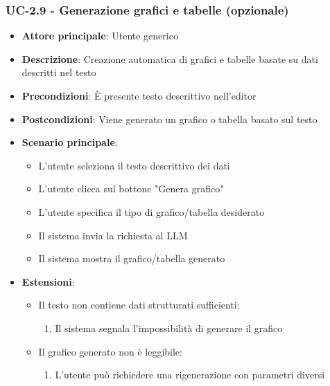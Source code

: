 \documentclass[11pt,a4paper]{article}
\begin{document}
\subsubsection{UC-2.9 - Generazione grafici e tabelle (opzionale)}
\begin{itemize}
    \item \textbf{Attore principale}: Utente generico
    \item \textbf{Descrizione}: Creazione automatica di grafici e tabelle basate su dati descritti nel testo
    \item \textbf{Precondizioni}: È presente testo descrittivo nell'editor
    \item \textbf{Postcondizioni}: Viene generato un grafico o tabella basato sul testo
    \item \textbf{Scenario principale}:
        \begin{itemize}
            \item L'utente seleziona il testo descrittivo dei dati
            \item L'utente clicca sul bottone "Genera grafico"
            \item L'utente specifica il tipo di grafico/tabella desiderato
            \item Il sistema invia la richiesta al LLM
            \item Il sistema mostra il grafico/tabella generato
        \end{itemize}
    \item \textbf{Estensioni}:
        \begin{itemize}
            \item Il testo non contiene dati strutturati sufficienti:
                \begin{enumerate}
                    \item Il sistema segnala l'impossibilità di generare il grafico
                \end{enumerate}
            \item Il grafico generato non è leggibile:
                \begin{enumerate}
                    \item L'utente può richiedere una rigenerazione con parametri diversi
                \end{enumerate}
        \end{itemize}
\end{itemize}
\end{document}
